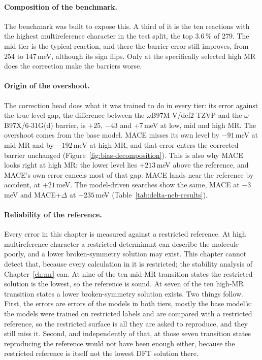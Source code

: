 \paragraph{Composition of the benchmark.} The benchmark was built to
expose this. A third of it is the ten reactions with the highest
multireference character in the test split, the top 3.6\,\% of 279.
The mid tier is the typical reaction, and there the
barrier error still improves, from 254 to 147\,meV, although its sign
flips. Only at the specifically selected high MR does the correction
make the barriers worse.

\paragraph{Origin of the overshoot.} The correction head does what it
was trained to do in every tier: its error against the true level gap,
the difference between the $\omega$B97M-V/def2-TZVP and the
$\omega$B97X/6-31G(d) barrier, is $+25$, $-43$ and $+7$\,meV at low, mid
and high MR. The overshoot
comes from the base model. MACE misses its own level by $-91$\,meV
at mid MR and by $-192$\,meV at high MR, and that error enters the
corrected barrier unchanged (Figure~\ref{fig:bias-decomposition}).
This is also why MACE looks right at high MR: the lower level
lies $+213$\,meV above the reference, and MACE's own error cancels
most of that gap. MACE lands near the reference by accident, at
$+21$\,meV. The model-driven searches show the same, MACE at
$-3$\,meV and MACE+$\Delta$ at $-235$\,meV
(Table~\ref{tab:delta-neb-results}).

\paragraph{Reliability of the reference.} Every error in this chapter
is measured against a restricted reference. At high multireference
character a restricted determinant can describe the molecule poorly,
and a lower broken-symmetry solution may exist. This chapter cannot
detect that, because every calculation in it is restricted; the
stability analysis of Chapter~\ref{ch:mr} can. At nine of the ten
mid-MR transition states the restricted solution is the lowest, so the
reference is sound. At seven of the ten high-MR transition states a
lower broken-symmetry solution exists. Two things follow. First, the
errors are errors of the models in both tiers, mostly the base model's:
the models were trained on restricted labels and are compared with a
restricted reference, so the restricted surface is all they are asked
to reproduce, and they still miss it. Second, and independently of
that, at those seven transition states reproducing the reference would
not have been enough either, because the restricted reference is itself
not the lowest DFT solution there.


